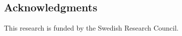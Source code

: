 \subsection*{Acknowledgments}
\noindent
This research is funded by the Swedish Research Council.




		






%
